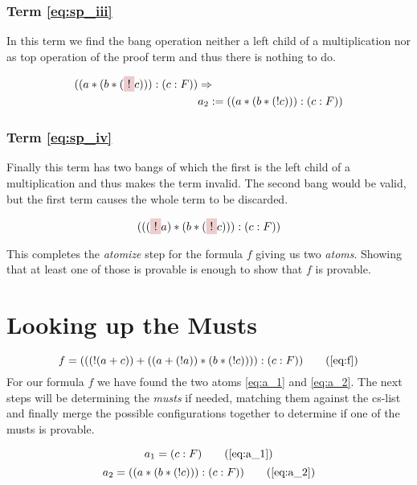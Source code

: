 \subsubsection[Third term]{Term \ref{eq:sp_iii}}
In this term we find the bang operation neither a left child of a multiplication nor as top operation of the proof term and thus there is nothing to do.

\begin{equation}\label{eq:a_2}
	\begin{split}
	((a *(b* (\tikz[baseline]{\node[fill=red!20,anchor=base] (t1){$!$};} c))):(c:F))	 & \Rightarrow \\
	& a_2 := ((a *(b* (! c))):(c:F))
	\end{split}
\end{equation}

\subsubsection[Fourths term]{Term \ref{eq:sp_iv}}
Finally this term has two bangs of which the first is the left child of a multiplication and thus makes the term invalid. The second bang would be valid, but the first term causes the whole term to be discarded.

\begin{equation*}
	(((
	\tikz[baseline]{\node[fill=red!20,anchor=base] (t1){$!$};} a)*(b* (
	\tikz[baseline]{\node[fill=red!20,anchor=base] (t1){$!$};} c))):(c:F))
\end{equation*}

\bigskip
This completes the \emph{atomize} step for the formula $f$ giving us two \emph{atoms}. Showing that at least one of those is provable is enough to show that $f$ is provable. 

\section{Looking up the Musts}

\begin{equation*}
		f = (((!(a+c))+((a+(!a))*(b*(!c)))):(c:F)) 
		\tag{\ref{eq:f}}  
\end{equation*}
For our formula $f$ we have found the two atoms \ref{eq:a_1} and \ref{eq:a_2}. The next steps will be determining the \emph{musts} if needed, matching them against the cs-list and finally merge the possible configurations together to determine if one of the musts is provable.


\begin{equation*}
		a_1 = (c:F) 
		\tag{\ref{eq:a_1}}
\end{equation*}
\begin{equation*}		
		a_2 = ((a *(b* (! c))):(c:F)) 
		\tag{\ref{eq:a_2}}
\end{equation*}

